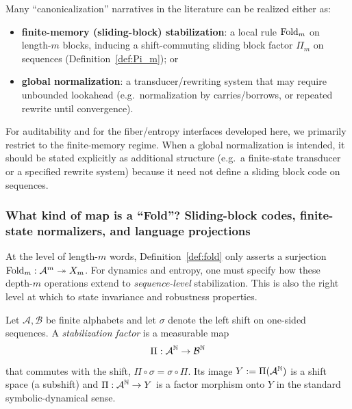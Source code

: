 \begin{remark}\label{rem:fold-two-regimes}
Many ``canonicalization'' narratives in the literature can be realized either as:
\begin{itemize}[leftmargin=*,itemsep=2pt]
  \item \textbf{finite-memory (sliding-block) stabilization}: a local rule $\mathrm{Fold}_m$ on length-$m$ blocks, inducing a shift-commuting sliding block factor $\Pi_m$ on sequences (Definition~\ref{def:Pi_m}); or
  \item \textbf{global normalization}: a transducer/rewriting system that may require unbounded lookahead (e.g.\ normalization by carries/borrows, or repeated rewrite until convergence).
\end{itemize}
For auditability and for the fiber/entropy interfaces developed here, we primarily restrict to the finite-memory regime. When a global normalization is intended, it should be stated explicitly as additional structure (e.g.\ a finite-state transducer or a specified rewrite system) because it need not define a sliding block code on sequences.
\end{remark}

\subsubsection{What kind of map is a ``Fold''? Sliding-block codes, finite-state normalizers, and language projections}\label{sec:stabilization:fold-realizations}

At the level of length-$m$ words, Definition~\ref{def:fold} only asserts a surjection $\mathrm{Fold}_m:\mathcal{A}^m\twoheadrightarrow X_m$. For dynamics and entropy, one must specify how these depth-$m$ operations extend to \emph{sequence-level} stabilization. This is also the right level at which to state invariance and robustness properties.

\begin{definition}\label{def:fold-factor-map}
Let $\mathcal{A},\mathcal{B}$ be finite alphabets and let $\sigma$ denote the left shift on one-sided sequences.
A \emph{stabilization factor} is a measurable map
\[
\Pi:\mathcal{A}^{\mathbb{N}}\to \mathcal{B}^{\mathbb{N}}
\]
that commutes with the shift, $\Pi\circ\sigma=\sigma\circ\Pi$.
Its image $Y:=\Pi(\mathcal{A}^{\mathbb{N}})$ is a shift space (a subshift) and $\Pi:\mathcal{A}^{\mathbb{N}}\to Y$ is a factor morphism onto $Y$ in the standard symbolic-dynamical sense.
\end{definition}

